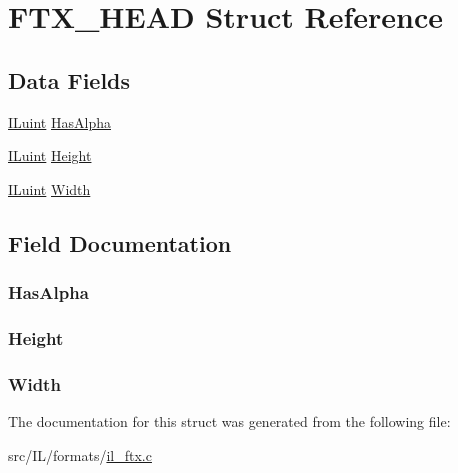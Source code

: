 \hypertarget{struct_f_t_x___h_e_a_d}{\section{F\-T\-X\-\_\-\-H\-E\-A\-D Struct Reference}
\label{struct_f_t_x___h_e_a_d}
}
\subsection*{Data Fields}
\begin{DoxyCompactItemize}
\item 
\hyperlink{il_8h_ac6508d0e9c19e32f32e00d54b5b8cf30}{I\-Luint} \hyperlink{struct_f_t_x___h_e_a_d_aa8472e0bf30217d712e1db78da1bfe24}{Has\-Alpha}
\item 
\hyperlink{il_8h_ac6508d0e9c19e32f32e00d54b5b8cf30}{I\-Luint} \hyperlink{struct_f_t_x___h_e_a_d_a8a8093d76b61a95fc96df24af29b107a}{Height}
\item 
\hyperlink{il_8h_ac6508d0e9c19e32f32e00d54b5b8cf30}{I\-Luint} \hyperlink{struct_f_t_x___h_e_a_d_a4146e7b2b0b4097e0e335f9b348392bf}{Width}
\end{DoxyCompactItemize}


\subsection{Field Documentation}
\hypertarget{struct_f_t_x___h_e_a_d_aa8472e0bf30217d712e1db78da1bfe24}{
\subsubsection[{Has\-Alpha}]{ Has\-Alpha}}\label{struct_f_t_x___h_e_a_d_aa8472e0bf30217d712e1db78da1bfe24}
\hypertarget{struct_f_t_x___h_e_a_d_a8a8093d76b61a95fc96df24af29b107a}{
\subsubsection[{Height}]{ Height}}\label{struct_f_t_x___h_e_a_d_a8a8093d76b61a95fc96df24af29b107a}
\hypertarget{struct_f_t_x___h_e_a_d_a4146e7b2b0b4097e0e335f9b348392bf}{
\subsubsection[{Width}]{ Width}}\label{struct_f_t_x___h_e_a_d_a4146e7b2b0b4097e0e335f9b348392bf}


The documentation for this struct was generated from the following file\-:\begin{DoxyCompactItemize}
\item 
src/\-I\-L/formats/\hyperlink{il__ftx_8c}{il\-\_\-ftx.\-c}\end{DoxyCompactItemize}

